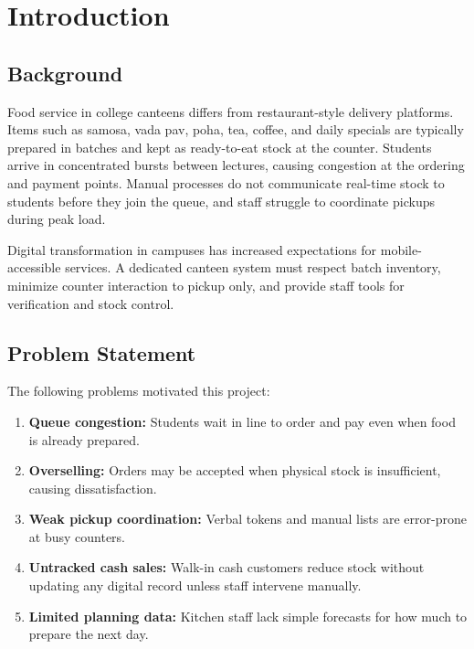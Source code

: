 \chapter{Introduction}

\section{Background}
Food service in college canteens differs from restaurant-style delivery platforms. Items such as samosa, vada pav, poha, tea, coffee, and daily specials are typically prepared in batches and kept as ready-to-eat stock at the counter. Students arrive in concentrated bursts between lectures, causing congestion at the ordering and payment points. Manual processes do not communicate real-time stock to students before they join the queue, and staff struggle to coordinate pickups during peak load.

Digital transformation in campuses has increased expectations for mobile-accessible services. A dedicated canteen system must respect batch inventory, minimize counter interaction to pickup only, and provide staff tools for verification and stock control.

\section{Problem Statement}
The following problems motivated this project:
\begin{enumerate}
  \item \textbf{Queue congestion:} Students wait in line to order and pay even when food is already prepared.
  \item \textbf{Overselling:} Orders may be accepted when physical stock is insufficient, causing dissatisfaction.
  \item \textbf{Weak pickup coordination:} Verbal tokens and manual lists are error-prone at busy counters.
  \item \textbf{Untracked cash sales:} Walk-in cash customers reduce stock without updating any digital record unless staff intervene manually.
  \item \textbf{Limited planning data:} Kitchen staff lack simple forecasts for how much to prepare the next day.
\end{enumerate}


